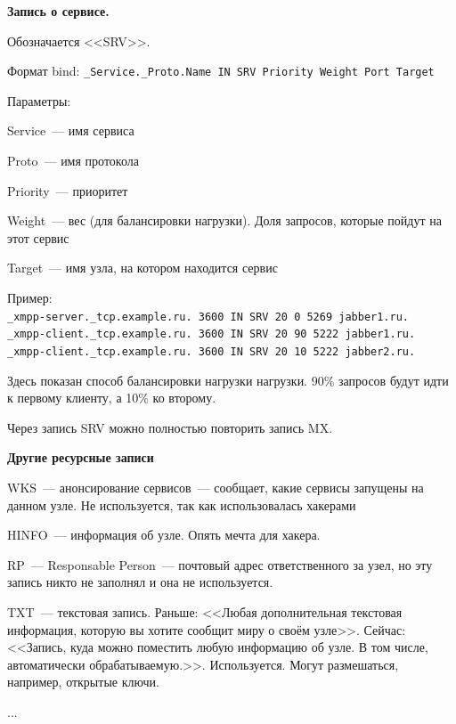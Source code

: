 {\bf Запись о сервисе.}

Обозначается <<SRV>>.

Формат bind: {\tt \_Service.\_Proto.Name IN SRV Priority Weight Port Target}

Параметры:
\begin{MyItemize}
    \item Service~--- имя сервиса
    \item Proto~--- имя протокола
    \item Priority~--- приоритет
    \item Weight~--- вес (для балансировки нагрузки). Доля запросов, которые пойдут на этот сервис
    \item Target~--- имя узла, на котором находится сервис
\end{MyItemize}

Пример:\\
{\tt \_xmpp-server.\_tcp.example.ru. 3600 IN SRV 20 0 5269 jabber1.ru.}\\
{\tt \_xmpp-client.\_tcp.example.ru. 3600 IN SRV 20 90 5222 jabber1.ru.}\\
{\tt \_xmpp-client.\_tcp.example.ru. 3600 IN SRV 20 10 5222 jabber2.ru.}

Здесь показан способ балансировки нагрузки нагрузки. 90\% запросов будут идти к первому клиенту, а 10\% ко второму.

Через запись SRV можно полностью повторить запись MX.

{\bf Другие ресурсные записи}
\begin{MyItemize}
    \item WKS~--- анонсирование сервисов~--- сообщает, какие сервисы запущены на данном узле. Не используется, так как использовалась хакерами
    \item HINFO~--- информация об узле. Опять мечта для хакера.
    \item RP~--- Responsable Person~--- почтовый адрес ответственного за узел, но эту запись никто не заполнял и она не используется.
    \item TXT~--- текстовая запись. Раньше: <<Любая дополнительная текстовая информация, которую вы хотите сообщит миру о своём узле>>. Сейчас: <<Запись, куда можно поместить любую информацию об узле. В том числе, автоматически обрабатываемую.>>. Используется. Могут размешаться, например, открытые ключи.
    \item ...
\end{MyItemize}


